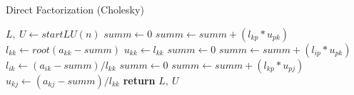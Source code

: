 \documentclass{article}
\begin{document}
  \begin{algorithm}
    \caption{Direct Factorization (Cholesky)}
    \begin{algorithmic}[1]
        \State $L,\ U \gets startLU(n)$
          \State $summ \gets 0$
            \State $summ \gets summ + (l_{kp} * u_{pk})$
          \EndFor
          \State $l_{kk} \gets root(a_{kk} - summ)$
          \State $u_{kk} \gets l_{kk}$
            \State $summ \gets 0$
              \State $summ \gets summ + (l_{ip} * u_{pk})$
            \EndFor
            \State $l_{ik} \gets (a_{ik} - summ) / l_{kk}$
          \EndFor
            \State $summ \gets 0$
              \State $summ \gets summ + (l_{kp} * u_{pj})$
            \EndFor
            \State $u_{kj} \gets (a_{kj} - summ) / l_{kk}$
          \EndFor
        \EndFor
        \State \textbf{return} $L,\ U$
      \EndProcedure
    \end{algorithmic}
  \end{algorithm}
\end{document}
